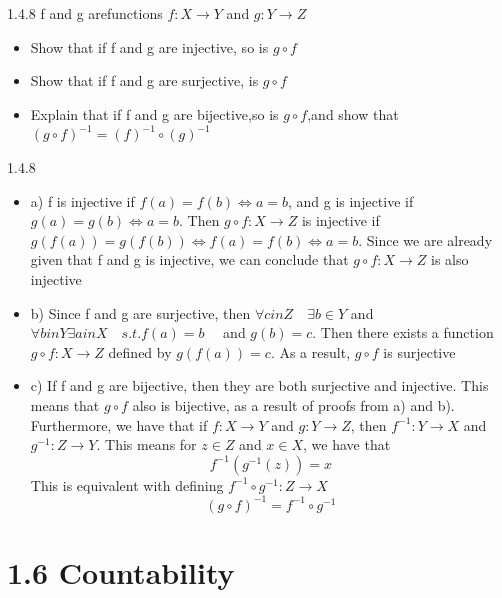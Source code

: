 \documentclass[a4paper,norsk]{article}
\begin{document}
\begin{oppgavebox}{1.4.8}{}
f and g arefunctions $ f: X \rightarrow Y $ and $ g: Y \rightarrow Z $
\begin{itemize}
  \item Show that if f and g are injective, so is $ g \circ f $ 
  \item Show that if f and g are surjective, is $ g \circ f $ 
  \item Explain that if f and g are bijective,so is $ g \circ f $,and show that $ \left( g\circ f \right)^{-1} = \left( f \right)^{-1} \circ \left( g \right) ^{-1}  $  
\end{itemize}

\begin{proofbox}{1.4.8}{}
  \begin{itemize}
    \item a) f is injective if $ f(a) = f(b) \iff a = b $, and g is injective if $ g(a) = g(b) \iff a = b $. Then $ g \circ f : X \rightarrow Z $ is injective if $ g(f(a)) = g(f(b)) \iff f(a) = f(b) \iff a = b $. Since we are already given that f and g is injective, we can conclude that $ g \circ f : X \rightarrow Z $ is also injective
    \item b) Since f and g are surjective, then $ \forall c in Z \quad \exists b \in Y $ and $ \forall b in Y \exists a in X \quad s.t. f(a) = b \quad $   and $ g(b) = c $. Then there exists a function $ g \circ f : X \rightarrow Z $ defined by $ g(f(a)) = c $. As a result, $ g \circ f $ is surjective
    \item c) If f and g are bijective, then they are both surjective and injective. This means that $ g \circ f $ also is bijective, as a result of proofs from a) and b). \\
    
    Furthermore, we have that if $ f: X \rightarrow Y $ and $ g: Y \rightarrow Z $, then $ f^{-1} : Y \rightarrow X $ and $ g^{-1} : Z \rightarrow Y$. This means for $ z \in Z $   and $ x \in X $, we have that
    \[
        f^{-1} \left( g^{-1} \left( z \right)  \right) = x
    \]
    This is equivalent with defining $ f^{-1} \circ g^{-1} : Z \rightarrow X $ 
    \[
        \left( g \circ f \right) ^{-1} = f^{-1} \circ g^{-1}
    \]
    
    
  \end{itemize}
\end{proofbox}
\end{oppgavebox}


\section*{1.6 Countability}
\end{document}
